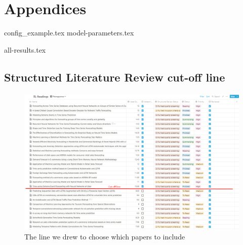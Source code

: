 
\chapter{Appendices}
\label{cha:appendices}
{config_example.tex}
{model-parameters.tex}

{all-results.tex}

\section{Structured Literature Review cut-off line}
\label{cha:slr-cut-off-line}

\begin{figure}[H]
  \centering
  \includegraphics[width=\textwidth]{./figs/illustrations/LSR-cut-off-line.png}
  \hfill
  \caption{The line we drew to choose which papers to include}
  \label{fig:slr-cut-off-line}
\end{figure}


